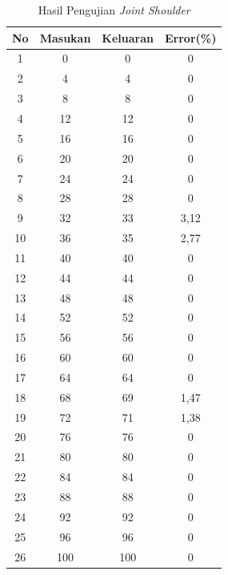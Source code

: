 \begin{longtable}{|c|c|c|c|}
	\caption{Hasil Pengujian \textit{Joint Shoulder}}
	\label{tbl.shoulder}\\
	\hline
	\rowcolor[HTML]{656565} 
	No & Masukan & Keluaran & Error(\%)       \\ \hline
	\endfirsthead
	\endhead
	1  & 0       & 0        & 0           \\ \hline
	2  & 4       & 4        & 0           \\ \hline
	3  & 8       & 8        & 0           \\ \hline
	4  & 12      & 12       & 0           \\ \hline
	5  & 16      & 16       & 0           \\ \hline
	6  & 20      & 20       & 0           \\ \hline
	7  & 24      & 24       & 0           \\ \hline
	8  & 28      & 28       & 0           \\ \hline
	9  & 32      & 33       & 3,12       \\ \hline
	10 & 36      & 35       & 2,77 \\ \hline
	11 & 40      & 40       & 0           \\ \hline
	12 & 44      & 44       & 0           \\ \hline
	13 & 48      & 48       & 0           \\ \hline
	14 & 52      & 52       & 0           \\ \hline
	15 & 56      & 56       & 0           \\ \hline
	16 & 60      & 60       & 0           \\ \hline
	17 & 64      & 64       & 0           \\ \hline
	18 & 68      & 69       & 1,47 \\ \hline
	19 & 72      & 71       & 1,38 \\ \hline
	20 & 76      & 76       & 0           \\ \hline
	21 & 80      & 80       & 0           \\ \hline
	22 & 84      & 84       & 0           \\ \hline
	23 & 88      & 88       & 0           \\ \hline
	24 & 92      & 92       & 0           \\ \hline
	25 & 96      & 96       & 0           \\ \hline
	26 & 100     & 100      & 0           \\ \hline

\end{longtable}
